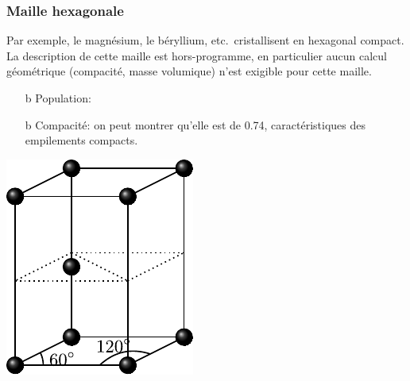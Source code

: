 \documentclass[../../main/main.tex]{subfiles}
\begin{document}
\subsubsection{Maille hexagonale}
Par exemple, le magnésium, le béryllium, etc.\ cristallisent en hexagonal
compact. La description de cette maille est hors-programme, en particulier aucun
calcul géométrique (compacité, masse volumique) n'est exigible pour cette
maille.
\smallbreak
\begin{isd}[righthand ratio=.20]
	\begin{itemize}
		\item[b]{Population}: %
		\item[b]{Compacité}: on peut montrer qu'elle est de \num{0.74},
		caractéristiques des empilements compacts.
	\end{itemize}
	\tcblower
	\begin{center}
		\includegraphics[width=\linewidth]{maille_hc}
	\end{center}
\end{isd}
\end{document}
